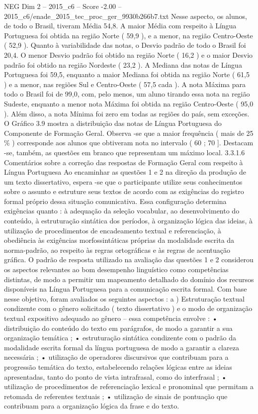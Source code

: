 \begin{textsample}{NEG Dim 2 – 2015\_c6 – Score -2.00 – 2015\_c6/enade\_2015\_tec\_proc\_ger\_9930b266b7.txt}
Nesse aspecto, os alunos, de todo o Brasil, tiveram Média 54,8.
A maior Média com respeito à Língua Portuguesa foi obtida na região Norte ( 59,9 ), e a menor, na região Centro-Oeste ( 52,9 ).
Quanto à variabilidade das notas, o Desvio padrão de todo o Brasil foi 20,4.
O menor Desvio padrão foi obtido na região Norte ( 16,2 ) e o maior Desvio padrão foi obtido na região Nordeste ( 23,2 ).
A Mediana das notas de Língua Portuguesa foi 59,5, enquanto a maior Mediana foi obtida na região Norte ( 61,5 ) e a menor, nas regiões Sul e Centro-Oeste ( 57,5 cada ).
A nota Máxima para todo o Brasil foi de 99,0, com, pelo menos, um aluno tirando essa nota na região Sudeste, enquanto a menor nota Máxima foi obtida na região Centro-Oeste ( 95,0 ).
Além disso, a nota Mínima foi zero em todas as regiões do país, sem exceções.
O Gráfico 3.9 mostra a distribuição das notas de Língua Portuguesa do Componente de Formação Geral.
Observa -se que a maior frequência ( mais de 25 \% ) corresponde aos alunos que obtiveram nota no intervalo ( 60 ; 70 ].
Destacam -se, também, as questões em branco que representam um máximo local. 3.3.1.6 Comentários sobre a correção das respostas de Formação Geral com respeito à Língua Portuguesa Ao encaminhar as questões 1 e 2 na direção da produção de um texto dissertativo, espera -se que o participante utilize seus conhecimentos sobre o assunto e estruture seus textos de acordo com as exigências do registro formal próprio dessa situação comunicativa.
Essa configuração determina exigências quanto : à adequação da seleção vocabular, ao desenvolvimento do conteúdo, à estruturação sintática dos períodos, à organização lógica das ideias, à utilização de procedimentos de encadeamento textual e referenciação, à obediência às exigências morfossintáticas próprias da modalidade escrita da norma-padrão, ao respeito às regras ortográficas e às regras de acentuação gráfica.
O padrão de resposta utilizado na avaliação das questões 1 e 2 considerou os aspectos relevantes ao bom desempenho linguístico como competências distintas, de modo a permitir um mapeamento detalhado do domínio dos recursos disponíveis na Língua Portuguesa para a comunicação escrita formal.
Com base nesse objetivo, foram avaliados os seguintes aspectos : a ) Estruturação textual condizente com o gênero solicitado ( texto dissertativo ) e o modo de organização textual expositivo adequado ao gênero – essa competência envolve : • distribuição do conteúdo do texto em parágrafos, de modo a garantir a sua organização temática ; • estruturação sintática condizente com o padrão da modalidade escrita formal da língua portuguesa de modo a garantir a clareza necessária ; • utilização de operadores discursivos que contribuam para a progressão temática do texto, estabelecendo relações lógicas entre as ideias apresentadas, tanto do ponto de vista intrafrasal, como do interfrasal ; • utilização de procedimentos de referenciação lexical e pronominal que permitam a retomada de referentes textuais ; • utilização de sinais de pontuação que contribuam para a organização lógica da frase e do texto.

\end{textsample}

